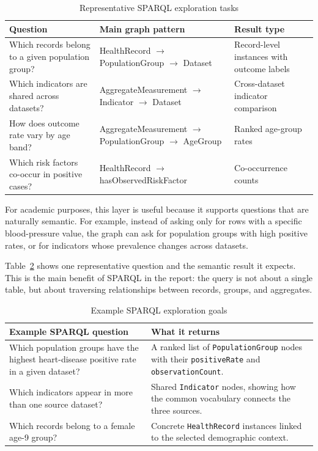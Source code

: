 \documentclass[11pt,a4paper]{article}
\begin{document}
\begin{table}[ht]
\centering
\begin{tabular}{|p{4cm}|p{4cm}|p{5cm}|}
\hline
\textbf{Question} & \textbf{Main graph pattern} & \textbf{Result type} \\ \hline
Which records belong to a given population group? & HealthRecord $\rightarrow$ PopulationGroup $\rightarrow$ Dataset & Record-level instances with outcome labels \\ \hline
Which indicators are shared across datasets? & AggregateMeasurement $\rightarrow$ Indicator $\rightarrow$ Dataset & Cross-dataset indicator comparison \\ \hline
How does outcome rate vary by age band? & AggregateMeasurement $\rightarrow$ PopulationGroup $\rightarrow$ AgeGroup & Ranked age-group rates \\ \hline
Which risk factors co-occur in positive cases? & HealthRecord $\rightarrow$ hasObservedRiskFactor & Co-occurrence counts \\ \hline
\end{tabular}
\caption{Representative SPARQL exploration tasks}
\label{tab:sparql-queries}
\end{table}

For academic purposes, this layer is useful because it supports questions that are naturally semantic. For example, instead of asking only for rows with a specific blood-pressure value, the graph can ask for population groups with high positive rates, or for indicators whose prevalence changes across datasets.

Table~\ref{tab:sparql-example} shows one representative question and the semantic result it expects. This is the main benefit of SPARQL in the report: the query is not about a single table, but about traversing relationships between records, groups, and aggregates.

\begin{table}[ht]
\centering
\begin{tabular}{|p{5cm}|p{5.2cm}|}
\hline
\textbf{Example SPARQL question} & \textbf{What it returns} \\ \hline
Which population groups have the highest heart-disease positive rate in a given dataset? & A ranked list of \texttt{PopulationGroup} nodes with their \texttt{positiveRate} and \texttt{observationCount}. \\ \hline
Which indicators appear in more than one source dataset? & Shared \texttt{Indicator} nodes, showing how the common vocabulary connects the three sources. \\ \hline
Which records belong to a female age-9 group? & Concrete \texttt{HealthRecord} instances linked to the selected demographic context. \\ \hline
\end{tabular}
\caption{Example SPARQL exploration goals}
\label{tab:sparql-example}
\end{table}
\end{document}
